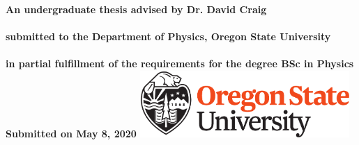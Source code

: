 

\thispagestyle{empty}

\begingroup
\centering
{}
~
\\[1em]
\sffamily\bfseries\fontsize{26}{31.2}\selectfont
\DocumentTitle
\\[0.6in]
\sffamily\bfseries\Large
\AuthorName
\\[0.6in]
\normalfont\normalsize
An undergraduate thesis advised by Dr. David Craig \\~\\
submitted to the Department of Physics, Oregon State University \\~\\
in partial fulfillment of the requirements for the degree BSc in Physics \\[0.6in]
Submitted on May 8, 2020
\vfill
\includegraphics[height=1.0in]
{Figure-SchoolLogo}
\par
\endgroup

\clearpage


%
%

%
%

